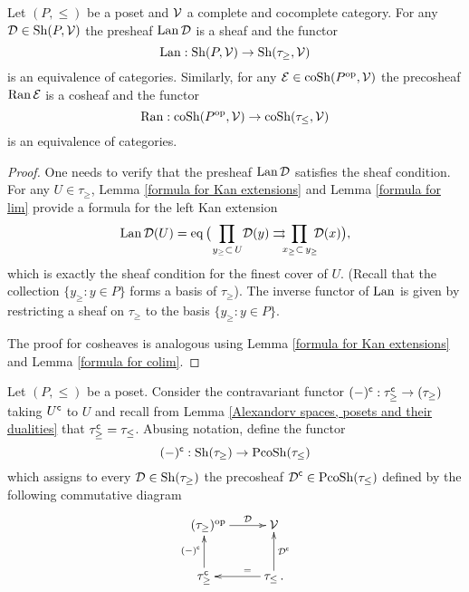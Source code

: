 \documentclass[main.tex]{subfiles}
\begin{document}
\begin{lemma}
Let $(P,\leq)$ be a poset and $\operatorname{\mathcal{V}}$ a complete and cocomplete category. For any $\operatorname{\mathcal{D}}\in\operatorname{Sh}(P,\operatorname{\mathcal{V}})$ the presheaf $\operatorname{Lan}\operatorname{\mathcal{D}}$ is a sheaf and the functor $$\operatorname{Lan}:\operatorname{Sh}(P,\operatorname{\mathcal{V}})\to\operatorname{Sh}(\tau_{\geq},\operatorname{\mathcal{V}})$$ is an equivalence of categories.
Similarly, for any $\operatorname{\mathcal{E}}\in\operatorname{coSh}(P^{\operatorname{op}},\operatorname{\mathcal{V}})$ the precosheaf $\operatorname{Ran}\operatorname{\mathcal{E}}$ is a cosheaf and the functor $$\operatorname{Ran}:\operatorname{coSh}(P^{\operatorname{op}},\operatorname{\mathcal{V}})\to\operatorname{coSh}(\tau_{\leq},\operatorname{\mathcal{V}})$$ is an equivalence of categories.
\begin{proof}
One needs to verify that the presheaf $\operatorname{Lan}\operatorname{\mathcal{D}}$ satisfies the sheaf condition. For any $U\in\tau_\geq$, Lemma \ref{formula for Kan extensions} and Lemma \ref{formula for lim} provide a formula for the left Kan extension
$$\Lan\D(U)=\eq\big(\!\!\!\prod_{\,\,\,y_\geq \subset\, U\ }\!\!\!\D(y)\rightrightarrows\!\!\!\!\prod_{\,x_\geq\subset\, y_\geq}\!\!\!\D(x)\big),$$
which is exactly the sheaf condition for the finest cover of $U$. (Recall that the collection $\{y_\geq:y\in P\}$ forms a basis of $\tau_\geq$). The inverse functor of $\operatorname{Lan}$ is given by restricting a sheaf on $\tau_\geq$ to the basis $\{y_\geq:y\in P\}$.

The proof for cosheaves is analogous using Lemma \ref{formula for Kan extensions} and Lemma \ref{formula for colim}.
\end{proof}
\end{lemma}

\begin{defn}
Let $(P,\leq)$ be a poset. Consider the contravariant functor $(-)^{\mathsf{c}}:\tau^{\mathsf{c}}_\geq\to(\tau_\geq)$ taking $U^{\mathsf{c}}$ to $U$ and recall from Lemma \ref{Alexandorv spaces, posets and their dualities} that $\tau_\geq^{\mathsf{c}}=\tau_\leq$. Abusing notation, define the functor $$(-)^{\mathsf{c}}:\operatorname{Sh}(\tau_\geq)\to\operatorname{PcoSh}(\tau_\leq)$$
which assigns to every $\operatorname{\mathcal{D}}\in\operatorname{Sh}(\tau_\geq)$ the precosheaf $\operatorname{\mathcal{D}}^{\mathsf{c}}\in\operatorname{PcoSh}(\tau_\leq)$ defined by the following commutative diagram
$$\xymatrix{\ \ (\tau_\geq)^{\op} \ar[r]^-{\D} & \V \\ \tau_\geq^{\c}\ar[u]^{(-)^{\c}} & \tau_\leq \,. \ar[l]_{\ \ \ \ =} \ar[u]_{\D^{\c}} }$$
\end{defn}
\end{document}
